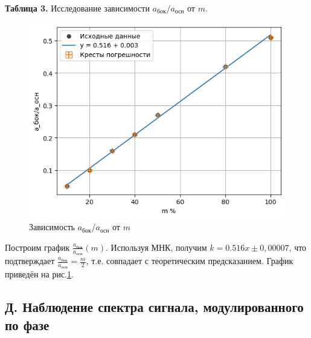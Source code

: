 \documentclass[a4paper,12pt]{article}
\begin{document}
\begin{enumerate}
\begin{center}
\textbf{Таблица 3.} Исследование зависимости $a_{\text{бок}}/a_{\text{осн}}$ от $m$.
\end{center}
\begin{figure}[h]
    \centering
    \includegraphics[width=0.7\linewidth]{grafic3.png}
    \caption{Зависимость $a_{\text{бок}}/a_{\text{осн}}$ от $m$}
    \label{grafic3}
\end{figure}
Построим график $\frac{a_{\text{бок}}}{a_{\text{осн}}}(m)$. Используя МНК, получим $k=0.516x\pm0,00007$, что подтверждает $\frac{a_{\text{бок}}}{a_{\text{осн}}}=\frac{m}{2}$, т.е. совпадает с теоретическим предсказанием. График приведён на рис.\ref{grafic3}.




\end{enumerate}








\newpage



\subsection*{Д. Наблюдение спектра сигнала, модулированного по фазе}
\end{document}
